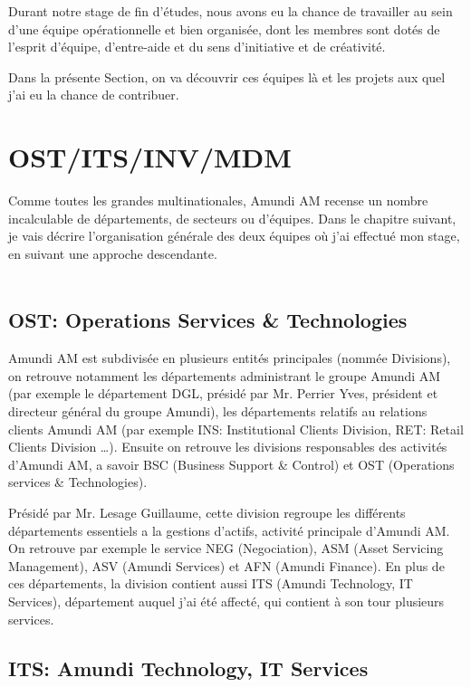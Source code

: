 \par Durant notre stage de fin d’études, nous avons eu la chance de travailler au sein d’une équipe opérationnelle et bien organisée, dont les membres sont dotés de l’esprit d’équipe, d’entre-aide et du sens d’initiative et de créativité.
\par Dans la présente Section, on va découvrir ces équipes là et les projets aux quel j'ai eu la chance de contribuer.

\begingroup
\let\clearpage\relax
\chapter{OST/ITS/INV/MDM}\label{mdm}
\endgroup

\par Comme toutes les grandes multinationales, Amundi AM recense un nombre incalculable de départements, de secteurs ou d'équipes. Dans le chapitre suivant, je vais décrire l’organisation générale des deux équipes où j’ai effectué mon stage, en suivant une approche descendante.
\\~\\

\section{OST: Operations Services \& Technologies}

\par Amundi AM est subdivisée en plusieurs entités principales (nommée Divisions), on retrouve notamment les départements administrant le groupe Amundi AM (par exemple le département DGL, présidé par Mr. Perrier Yves, président et directeur général du groupe Amundi), les départements relatifs au relations clients Amundi AM (par exemple INS: Institutional Clients Division, RET: Retail Clients Division \dots). Ensuite on retrouve les divisions responsables des activités d'Amundi AM, a savoir BSC (Business Support \& Control) et OST (Operations services \& Technologies). 
\par Présidé par Mr. Lesage Guillaume, cette division regroupe les différents départements essentiels a la gestions d'actifs, activité principale d'Amundi AM. On retrouve par exemple le service NEG (Negociation), ASM (Asset Servicing Management), ASV (Amundi Services) et AFN (Amundi Finance). En plus de ces départements, la division contient aussi ITS (Amundi Technology, IT Services), département auquel j'ai été affecté, qui contient à son tour plusieurs services. 
\clearpage
\section{ITS: Amundi Technology, IT Services}

